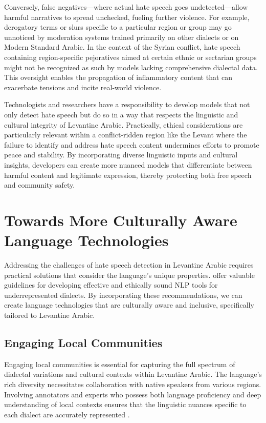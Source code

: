 \documentclass[11pt]{article}
\begin{document}
Conversely, false negatives—where actual hate speech goes undetected—allow harmful narratives to spread unchecked, fueling further violence. For example, derogatory terms or slurs specific to a particular region or group may go unnoticed by moderation systems trained primarily on other dialects or on Modern Standard Arabic. In the context of the Syrian conflict, hate speech containing region-specific pejoratives aimed at certain ethnic or sectarian groups might not be recognized as such by models lacking comprehensive dialectal data. This oversight enables the propagation of inflammatory content that can exacerbate tensions and incite real-world violence.

Technologists and researchers have a responsibility to develop models that not only detect hate speech but do so in a way that respects the linguistic and cultural integrity of Levantine Arabic. Practically, ethical considerations are particularly relevant within a conflict-ridden region like the Levant where the failure to identify and address hate speech content undermines efforts to promote peace and stability. By incorporating diverse linguistic inputs and cultural insights, developers can create more nuanced models that differentiate between harmful content and legitimate expression, thereby protecting both free speech and community safety.


\section{Towards More Culturally Aware Language Technologies}

Addressing the challenges of hate speech detection in Levantine Arabic requires practical solutions that consider the language's unique properties. \citet{bergman2022responsiblenaturallanguageannotation} offer valuable guidelines for developing effective and ethically sound NLP tools for underrepresented dialects. By incorporating these recommendations, we can create language technologies that are culturally aware and inclusive, specifically tailored to Levantine Arabic.


\subsection{Engaging Local Communities}

Engaging local communities is essential for capturing the full spectrum of dialectal variations and cultural contexts within Levantine Arabic. The language's rich diversity necessitates collaboration with native speakers from various regions. Involving annotators and experts who possess both language proficiency and deep understanding of local contexts ensures that the linguistic nuances specific to each dialect are accurately represented \citep{radiya-dixit_bogen_2024}.
\end{document}
